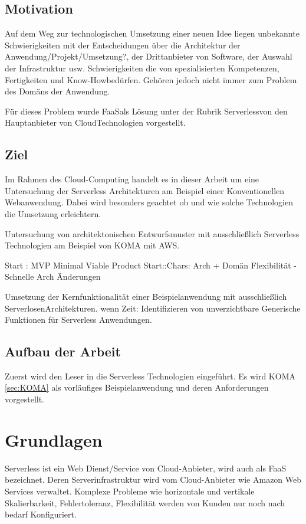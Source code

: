 \documentclass[
12pt,
english,
ngerman,
headsepline,
twoside,
openright,
numbers=noenddot,version=first
]{scrreprt}
\begin{document}
\section{Motivation}


Auf dem Weg zur technologischen Umsetzung einer neuen Idee liegen unbekannte Schwierigkeiten mit der Entscheidungen über die Architektur der Anwendung/Projekt/Umsetzung?, der Drittanbieter von Software, der Auswahl der Infrastruktur usw. Schwierigkeiten die von spezialisierten Kompetenzen, Fertigkeiten und \glqq Know-How\grqq bedürfen. Gehören jedoch nicht immer zum Problem des Domäns der Anwendung. 


Für dieses Problem wurde \glqq FaaS\grqq als Lösung unter der Rubrik \glqq Serverless\grqq von den Hauptanbieter von \glqq Cloud\grqq Technologien vorgestellt. 



\section{Ziel}
\label{sec:task}

Im Rahmen des Cloud-Computing handelt es in dieser Arbeit um eine Untersuchung der Serverless Architekturen am Beispiel einer Konventionellen Webanwendung. Dabei wird besonders geachtet ob und wie solche Technologien die Umsetzung erleichtern.

Untersuchung von architektonischen Entwurfsmuster mit ausschließlich Serverless Technologien am Beispiel von KOMA mit AWS. 

Start : MVP Minimal Viable Product  
Start::Chars: Arch + Domän Flexibilität - Schnelle Arch Änderungen

Umsetzung der Kernfunktionalität einer Beispielanwendung mit ausschließlich \glqq Serverlosen\grqq Architekturen.
wenn Zeit: Identifizieren von unverzichtbare Generische Funktionen für Serverless Anwendungen.


\section{Aufbau der Arbeit}
\label{sec:layout}

Zuerst wird den Leser in die Serverless Technologien eingeführt. 
Es wird KOMA \ref{sec:KOMA} als vorläufiges Beispielanwendung und deren Anforderungen vorgestellt. 

\chapter{Grundlagen}
\label{chap:principles}
Serverless ist ein Web Dienst/Service von Cloud-Anbieter, wird auch als FaaS bezeichnet. Deren Serverinfrastruktur wird vom Cloud-Anbieter wie Amazon Web Services verwaltet. Komplexe Probleme wie horizontale und vertikale Skalierbarkeit, Fehlertoleranz, Flexibilität werden von Kunden nur noch nach bedarf Konfiguriert. 
\end{document}
